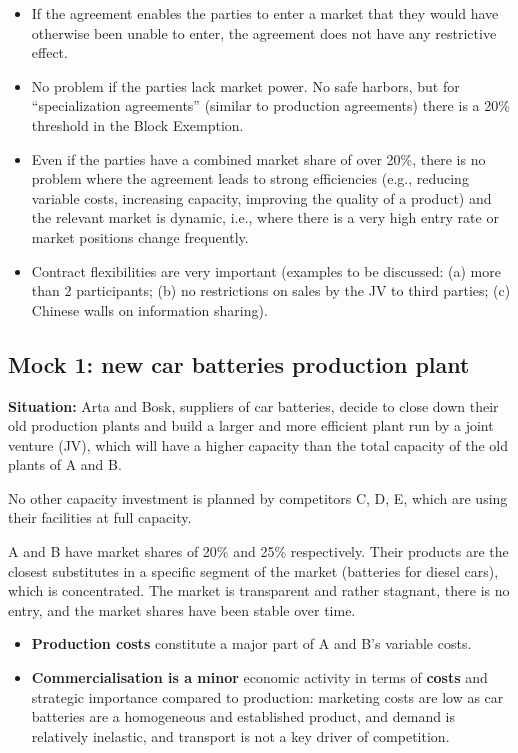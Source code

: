         \begin{itemize}
            \item If the agreement enables the parties to enter a market that they would have otherwise been unable to enter, the agreement does not have any restrictive effect.
            \item No problem if the parties lack market power. No safe harbors, but for “specialization agreements” (similar to production agreements) there is a 20\% threshold in the Block Exemption.
            \item Even if the parties have a combined market share of over 20\%, there is no problem where the agreement leads to strong efficiencies (e.g., reducing variable costs, increasing capacity, improving the quality of a product) and the relevant market is dynamic, i.e., where there is a very high entry rate or market positions change frequently.
            \item Contract flexibilities are very important (examples to be discussed: (a) more than 2 participants; (b) no restrictions on sales by the JV to third parties; (c) Chinese walls on information sharing).
        \end{itemize}

    \subsection{Mock 1: new car batteries production plant}

        \textbf{Situation:} Arta and Bosk, suppliers of car batteries, decide to close down their old production plants and build a larger and more efficient plant run by a joint venture (JV), which will have a higher capacity than the total capacity of the old plants of A and B.

        No other capacity investment is planned by competitors C, D, E, which are using their facilities at full capacity.
        
        A and B have market shares of 20\% and 25\% respectively. Their products are the closest substitutes in a specific segment of the market (batteries for diesel cars), which is concentrated. The market is transparent and rather stagnant, there is no entry, and the market shares have been stable over time.
        
        \begin{itemize}
            \item \textbf{Production costs} constitute a major part of A and B's variable costs. 
            \item \textbf{Commercialisation is a minor} economic activity in terms of \textbf{costs} and strategic importance compared to production: marketing costs are low as car batteries are a homogeneous and established product, and demand is relatively inelastic, and transport is not a key driver of competition.
        \end{itemize}

